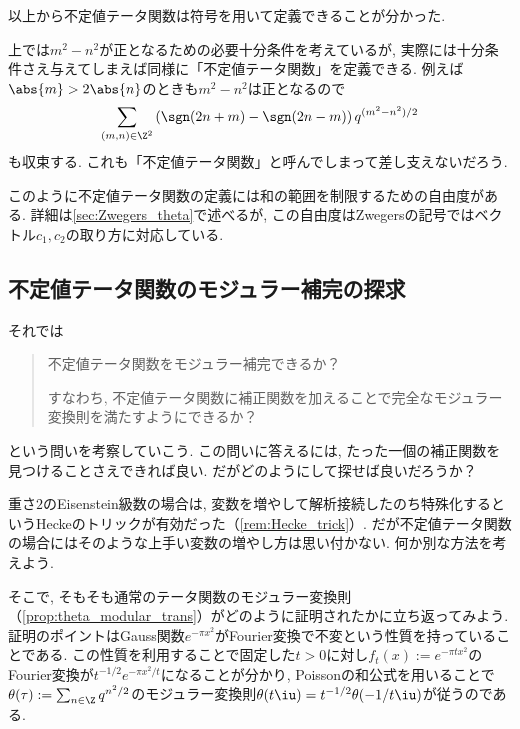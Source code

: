 \documentclass[11pt,b5paper,oneside,lualatex]{ltjsarticle} %
\numberwithin{equation}{section} %
\begin{document}
以上から不定値テータ関数は符号を用いて定義できることが分かった. 

\begin{rem} \label{rem:indef_ambiguity}
	上では$ m^2 - n^2 $が正となるための必要十分条件を考えているが, 実際には十分条件さえ与えてしまえば同様に「不定値テータ関数」を定義できる. 
	例えば$ \abs{m} > 2\abs{n} $のときも$ m^2 - n^2 $は正となるので
	\[
	\sum_{(m, n) \in \Z^2} \left( \sgn(2n+m) - \sgn(2n-m) \right) q^{(m^2 - n^2)/2}
	\]
	も収束する. 
	これも「不定値テータ関数」と呼んでしまって差し支えないだろう. 
	
	このように不定値テータ関数の定義には和の範囲を制限するための自由度がある. 
	詳細は\cref{sec:Zwegers_theta}で述べるが, この自由度はZwegersの記号ではベクトル$ c_1, c_2 $の取り方に対応している. 
\end{rem}



\subsection{不定値テータ関数のモジュラー補完の探求} \label{subsec:modular_completion}


それでは
\begin{quote}
	\centering
	不定値テータ関数をモジュラー補完できるか？
	
	すなわち, 不定値テータ関数に補正関数を加えることで完全なモジュラー変換則を満たすようにできるか？
\end{quote}
という問いを考察していこう. 
この問いに答えるには, たった一個の補正関数を見つけることさえできれば良い. 
だがどのようにして探せば良いだろうか？

重さ$ 2 $のEisenstein級数の場合は, 変数を増やして解析接続したのち特殊化するというHeckeのトリックが有効だった（\cref{rem:Hecke_trick}）. 
だが不定値テータ関数の場合にはそのような上手い変数の増やし方は思い付かない. 
何か別な方法を考えよう. 

そこで, そもそも通常のテータ関数のモジュラー変換則（\cref{prop:theta_modular_trans}）がどのように証明されたかに立ち返ってみよう. 
証明のポイントはGauss関数$ e^{-\pi x^2} $がFourier変換で不変という性質を持っていることである. 
この性質を利用することで固定した$ t > 0 $に対し$ f_t (x) := e^{-\pi t x^2} $のFourier変換が$ t^{-1/2} e^{-\pi  x^2/t} $になることが分かり, Poissonの和公式を用いることで$ \theta (\tau) := \sum_{n \in \Z} q^{n^2/2} $のモジュラー変換則$ \theta (t\iu) = t^{-1/2} \theta (-1/t\iu) $が従うのである. 
\end{document}
